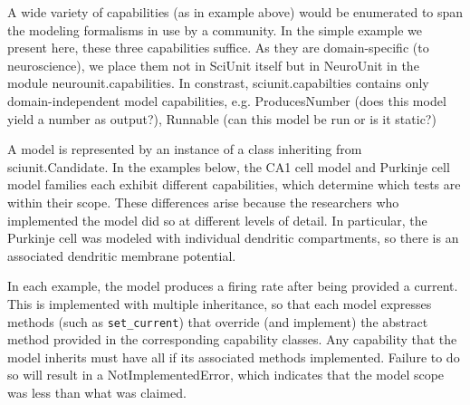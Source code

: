 \documentclass[11pt,letterpaper]{article}
\begin{document}
A wide variety of capabilities (as in example above) would be enumerated to span the modeling formalisms in use by a community. In the simple example we present here, these three capabilities suffice.  As they are domain-specific (to neuroscience), we place them not in SciUnit itself but in NeuroUnit in the module neurounit.capabilities.  In constrast, sciunit.capabilties contains only domain-independent model capabilities, e.g. ProducesNumber (does this model yield a number as output?), Runnable (can this model be run or is it static?)

A model is represented by an instance of a class inheriting from sciunit.Candidate.  In the examples below, the CA1 cell model and Purkinje cell model families each exhibit different capabilities, which determine which tests are within their scope.  These differences arise because the researchers who implemented the model did so at different levels of detail.  In particular, the Purkinje cell was modeled with individual dendritic compartments, so there is an associated dendritic membrane potential. 

In each example, the model produces a firing rate after being provided a current.  This is implemented with multiple inheritance, so that each model expresses methods (such as \verb|set_current|) that override (and implement) the abstract method provided in the corresponding capability classes.  Any capability that the model inherits must have all if its associated methods implemented.  Failure to do so will result in a NotImplementedError, which indicates that the model scope was less than what was claimed.  

\end{document}
